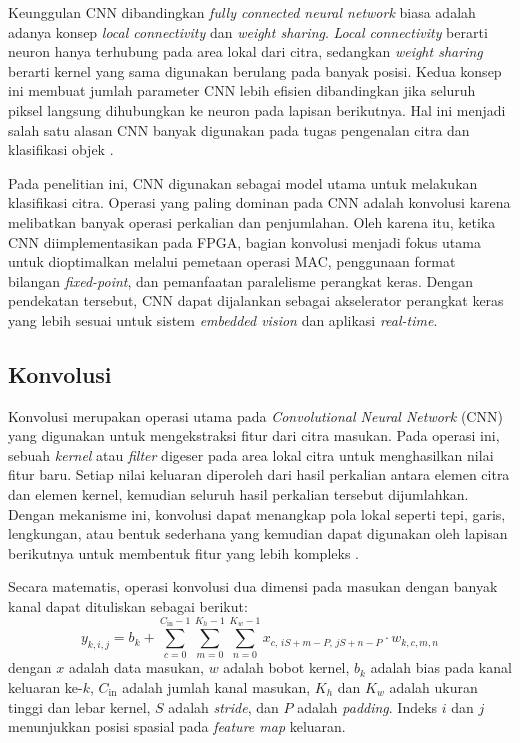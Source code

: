     Keunggulan CNN dibandingkan \emph{fully connected neural network} biasa adalah adanya konsep \emph{local connectivity} dan \emph{weight sharing}. \emph{Local connectivity} berarti neuron hanya terhubung pada area lokal dari citra, sedangkan \emph{weight sharing} berarti kernel yang sama digunakan berulang pada banyak posisi. Kedua konsep ini membuat jumlah parameter CNN lebih efisien dibandingkan jika seluruh piksel langsung dihubungkan ke neuron pada lapisan berikutnya. Hal ini menjadi salah satu alasan CNN banyak digunakan pada tugas pengenalan citra dan klasifikasi objek \cite{AlexNetPaper}.

    Pada penelitian ini, CNN digunakan sebagai model utama untuk melakukan klasifikasi citra. Operasi yang paling dominan pada CNN adalah konvolusi karena melibatkan banyak operasi perkalian dan penjumlahan. Oleh karena itu, ketika CNN diimplementasikan pada FPGA, bagian konvolusi menjadi fokus utama untuk dioptimalkan melalui pemetaan operasi MAC, penggunaan format bilangan \emph{fixed-point}, dan pemanfaatan paralelisme perangkat keras. Dengan pendekatan tersebut, CNN dapat dijalankan sebagai akselerator perangkat keras yang lebih sesuai untuk sistem \emph{embedded vision} dan aplikasi \emph{real-time}.



  \subsection{Konvolusi}
  Konvolusi merupakan operasi utama pada \emph{Convolutional Neural Network} (CNN) yang digunakan untuk mengekstraksi fitur dari citra masukan. Pada operasi ini, sebuah \emph{kernel} atau \emph{filter} digeser pada area lokal citra untuk menghasilkan nilai fitur baru. Setiap nilai keluaran diperoleh dari hasil perkalian antara elemen citra dan elemen kernel, kemudian seluruh hasil perkalian tersebut dijumlahkan. Dengan mekanisme ini, konvolusi dapat menangkap pola lokal seperti tepi, garis, lengkungan, atau bentuk sederhana yang kemudian dapat digunakan oleh lapisan berikutnya untuk membentuk fitur yang lebih kompleks \cite{Goodfellow2016DeepLearning,Lecun1998GradientBasedLearning}.

  Secara matematis, operasi konvolusi dua dimensi pada masukan dengan banyak kanal dapat dituliskan sebagai berikut:
  \begin{equation}
    y_{k,i,j} =
    b_k +
    \sum_{c=0}^{C_{\text{in}}-1}
    \sum_{m=0}^{K_h-1}
    \sum_{n=0}^{K_w-1}
    x_{c,\,iS+m-P,\,jS+n-P}
    \cdot
    w_{k,c,m,n}
    \label{eq:conv2d}
  \end{equation}
    dengan $x$ adalah data masukan, $w$ adalah bobot kernel, $b_k$ adalah bias pada kanal keluaran ke-$k$, $C_{\text{in}}$ adalah jumlah kanal masukan, $K_h$ dan $K_w$ adalah ukuran tinggi dan lebar kernel, $S$ adalah \emph{stride}, dan $P$ adalah \emph{padding}. Indeks $i$ dan $j$ menunjukkan posisi spasial pada \emph{feature map} keluaran.

